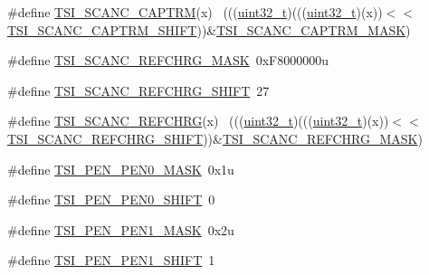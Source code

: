 \begin{DoxyCompactItemize}
\item 
\#define \hyperlink{group___t_s_i___register___masks_ga7cc66d016c2eceeaaa0f646f2c3c0c18}{T\+S\+I\+\_\+\+S\+C\+A\+N\+C\+\_\+\+C\+A\+P\+T\+RM}(x)                                        ~(((\hyperlink{_p_e___types_8h_a33594304e786b158f3fb30289278f5af}{uint32\+\_\+t})(((\hyperlink{_p_e___types_8h_a33594304e786b158f3fb30289278f5af}{uint32\+\_\+t})(x))$<$$<$\hyperlink{group___t_s_i___register___masks_gaac5874a969cb660929d3536ca0f19ebb}{T\+S\+I\+\_\+\+S\+C\+A\+N\+C\+\_\+\+C\+A\+P\+T\+R\+M\+\_\+\+S\+H\+I\+FT}))\&\hyperlink{group___t_s_i___register___masks_ga55a6de6ab83ae86173441040de6a0e90}{T\+S\+I\+\_\+\+S\+C\+A\+N\+C\+\_\+\+C\+A\+P\+T\+R\+M\+\_\+\+M\+A\+SK})
\item 
\#define \hyperlink{group___t_s_i___register___masks_ga080be6d8826668cf4d63346b449931ed}{T\+S\+I\+\_\+\+S\+C\+A\+N\+C\+\_\+\+R\+E\+F\+C\+H\+R\+G\+\_\+\+M\+A\+SK}~0x\+F8000000u
\item 
\#define \hyperlink{group___t_s_i___register___masks_ga636c8873ea4eb5255f0f76fef1a8a5ba}{T\+S\+I\+\_\+\+S\+C\+A\+N\+C\+\_\+\+R\+E\+F\+C\+H\+R\+G\+\_\+\+S\+H\+I\+FT}~27
\item 
\#define \hyperlink{group___t_s_i___register___masks_ga1e5d38ac15864f154123a96f9f4b5720}{T\+S\+I\+\_\+\+S\+C\+A\+N\+C\+\_\+\+R\+E\+F\+C\+H\+RG}(x)                                      ~(((\hyperlink{_p_e___types_8h_a33594304e786b158f3fb30289278f5af}{uint32\+\_\+t})(((\hyperlink{_p_e___types_8h_a33594304e786b158f3fb30289278f5af}{uint32\+\_\+t})(x))$<$$<$\hyperlink{group___t_s_i___register___masks_ga636c8873ea4eb5255f0f76fef1a8a5ba}{T\+S\+I\+\_\+\+S\+C\+A\+N\+C\+\_\+\+R\+E\+F\+C\+H\+R\+G\+\_\+\+S\+H\+I\+FT}))\&\hyperlink{group___t_s_i___register___masks_ga080be6d8826668cf4d63346b449931ed}{T\+S\+I\+\_\+\+S\+C\+A\+N\+C\+\_\+\+R\+E\+F\+C\+H\+R\+G\+\_\+\+M\+A\+SK})
\item 
\#define \hyperlink{group___t_s_i___register___masks_ga2fe95bf659075368ab23b5876de8d79d}{T\+S\+I\+\_\+\+P\+E\+N\+\_\+\+P\+E\+N0\+\_\+\+M\+A\+SK}~0x1u
\item 
\#define \hyperlink{group___t_s_i___register___masks_ga74f58c20a9a8ec69dd0d4e5f4e1eb07d}{T\+S\+I\+\_\+\+P\+E\+N\+\_\+\+P\+E\+N0\+\_\+\+S\+H\+I\+FT}~0
\item 
\#define \hyperlink{group___t_s_i___register___masks_gaeefece47c8a990e2b0ee71e68b2e35a7}{T\+S\+I\+\_\+\+P\+E\+N\+\_\+\+P\+E\+N1\+\_\+\+M\+A\+SK}~0x2u
\item 
\#define \hyperlink{group___t_s_i___register___masks_ga8e5d3fd7f263031f112fe920ea105aaf}{T\+S\+I\+\_\+\+P\+E\+N\+\_\+\+P\+E\+N1\+\_\+\+S\+H\+I\+FT}~1

\end{DoxyCompactItemize}
